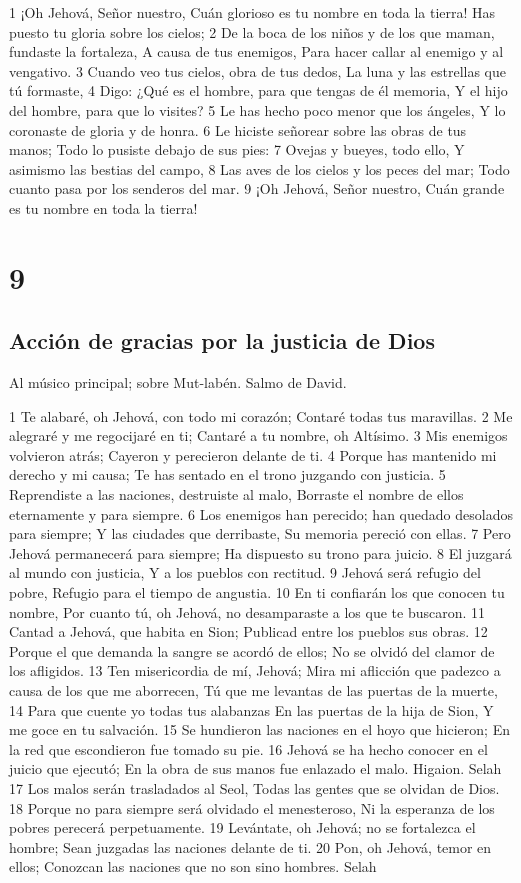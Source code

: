 1 ¡Oh Jehová, Señor nuestro,
Cuán glorioso es tu nombre en toda la tierra!
Has puesto tu gloria sobre los cielos;
2 De la boca de los niños y de los que maman, fundaste la fortaleza,
A causa de tus enemigos,
Para hacer callar al enemigo y al vengativo.
3 Cuando veo tus cielos, obra de tus dedos,
La luna y las estrellas que tú formaste,
4 Digo: ¿Qué es el hombre, para que tengas de él memoria,
Y el hijo del hombre, para que lo visites?
5 Le has hecho poco menor que los ángeles,
Y lo coronaste de gloria y de honra.
6 Le hiciste señorear sobre las obras de tus manos;
Todo lo pusiste debajo de sus pies:
7 Ovejas y bueyes, todo ello,
Y asimismo las bestias del campo,
8 Las aves de los cielos y los peces del mar;
Todo cuanto pasa por los senderos del mar.
9 ¡Oh Jehová, Señor nuestro,
Cuán grande es tu nombre en toda la tierra!

\chapter{9}

\section*{Acción de gracias por la justicia de Dios}

Al músico principal; sobre Mut-labén. Salmo de David.

1 Te alabaré, oh Jehová, con todo mi corazón;
Contaré todas tus maravillas.
2 Me alegraré y me regocijaré en ti;
Cantaré a tu nombre, oh Altísimo.
3 Mis enemigos volvieron atrás;
Cayeron y perecieron delante de ti.
4 Porque has mantenido mi derecho y mi causa;
Te has sentado en el trono juzgando con justicia.
5 Reprendiste a las naciones, destruiste al malo,
Borraste el nombre de ellos eternamente y para siempre.
6 Los enemigos han perecido; han quedado desolados para siempre;
Y las ciudades que derribaste,
Su memoria pereció con ellas.
7 Pero Jehová permanecerá para siempre;
Ha dispuesto su trono para juicio.
8 El juzgará al mundo con justicia,
Y a los pueblos con rectitud.
9 Jehová será refugio del pobre,
Refugio para el tiempo de angustia.
10 En ti confiarán los que conocen tu nombre,
Por cuanto tú, oh Jehová, no desamparaste a los que te buscaron.
11 Cantad a Jehová, que habita en Sion;
Publicad entre los pueblos sus obras.
12 Porque el que demanda la sangre se acordó de ellos;
No se olvidó del clamor de los afligidos.
13 Ten misericordia de mí, Jehová;
Mira mi aflicción que padezco a causa de los que me aborrecen,
Tú que me levantas de las puertas de la muerte,
14 Para que cuente yo todas tus alabanzas
En las puertas de la hija de Sion,
Y me goce en tu salvación.
15 Se hundieron las naciones en el hoyo que hicieron;
En la red que escondieron fue tomado su pie.
16 Jehová se ha hecho conocer en el juicio que ejecutó;
En la obra de sus manos fue enlazado el malo. Higaion. Selah
17 Los malos serán trasladados al Seol,
Todas las gentes que se olvidan de Dios.
18 Porque no para siempre será olvidado el menesteroso,
Ni la esperanza de los pobres perecerá perpetuamente.
19 Levántate, oh Jehová; no se fortalezca el hombre;
Sean juzgadas las naciones delante de ti.
20 Pon, oh Jehová, temor en ellos;
Conozcan las naciones que no son sino hombres. Selah

